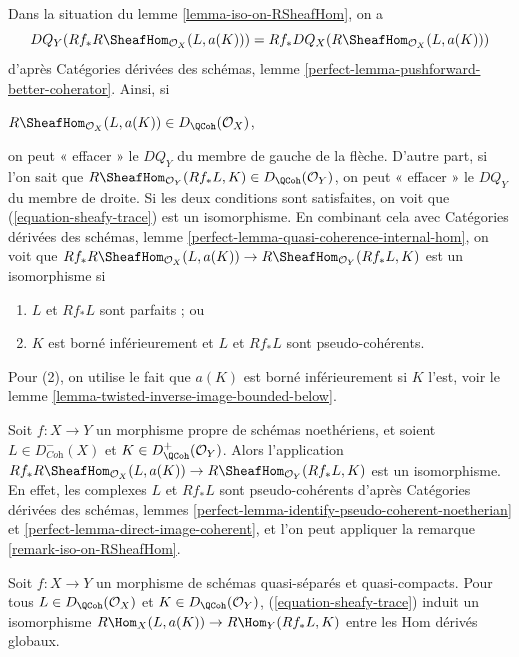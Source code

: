 \begin{remark}
\label{remark-iso-on-RSheafHom}
Dans la situation du lemme \ref{lemma-iso-on-RSheafHom}, on a
$$
DQ_Y(Rf_*R\SheafHom_{\mathcal{O}_X}(L, a(K))) =
Rf_* DQ_X(R\SheafHom_{\mathcal{O}_X}(L, a(K)))
$$
\begingroup\emergencystretch=16pt
d'après Catégories dérivées des schémas, lemme \ref{perfect-lemma-pushforward-better-coherator}. Ainsi, si
\par\noindent\hfil
$R\SheafHom_{\mathcal{O}_X}(L, a(K)) \in D_\QCoh(\mathcal{O}_X)$,
\hfil\par\noindent
on peut « effacer » le $DQ_Y$ du membre de gauche de la flèche. D'autre part, si l'on sait que $R\SheafHom_{\mathcal{O}_Y}(Rf_*L, K) \in D_\QCoh(\mathcal{O}_Y)$, on peut « effacer » le $DQ_Y$ du membre de droite. Si les deux conditions sont satisfaites, on voit que (\ref{equation-sheafy-trace}) est un isomorphisme. En combinant cela avec Catégories dérivées des schémas, lemme \ref{perfect-lemma-quasi-coherence-internal-hom}, on voit que $Rf_*R\SheafHom_{\mathcal{O}_X}(L, a(K)) \to
R\SheafHom_{\mathcal{O}_Y}(Rf_*L, K)$ est un isomorphisme si\par\endgroup
\begin{enumerate}
\item $L$ et $Rf_*L$ sont parfaits ; ou
\item $K$ est borné inférieurement et $L$ et $Rf_*L$ sont pseudo-cohérents.
\end{enumerate}
Pour (2), on utilise le fait que $a(K)$ est borné inférieurement si $K$ l'est, voir le lemme \ref{lemma-twisted-inverse-image-bounded-below}.
\end{remark}

\begin{example}
\label{example-iso-on-RSheafHom-noetherian}
\begingroup\emergencystretch=16pt
Soit $f : X \to Y$ un morphisme propre de schémas noethériens, et soient $L \in D^-_{\textit{Coh}}(X)$ et $K \in D^+_{\QCoh}(\mathcal{O}_Y)$. Alors l'application $Rf_*R\SheafHom_{\mathcal{O}_X}(L, a(K)) \to
R\SheafHom_{\mathcal{O}_Y}(Rf_*L, K)$ est un isomorphisme. En effet, les complexes $L$ et $Rf_*L$ sont pseudo-cohérents d'après Catégories dérivées des schémas, lemmes \ref{perfect-lemma-identify-pseudo-coherent-noetherian} et \ref{perfect-lemma-direct-image-coherent}, et l'on peut appliquer la remarque \ref{remark-iso-on-RSheafHom}.\par\endgroup
\end{example}

\begin{lemma}
\label{lemma-iso-global-hom}
Soit $f : X \to Y$ un morphisme de schémas quasi-séparés et quasi-compacts. Pour tous $L \in D_\QCoh(\mathcal{O}_X)$ et $K \in D_\QCoh(\mathcal{O}_Y)$, (\ref{equation-sheafy-trace}) induit un isomorphisme $R\Hom_X(L, a(K)) \to R\Hom_Y(Rf_*L, K)$ entre les Hom dérivés globaux.
\end{lemma}

